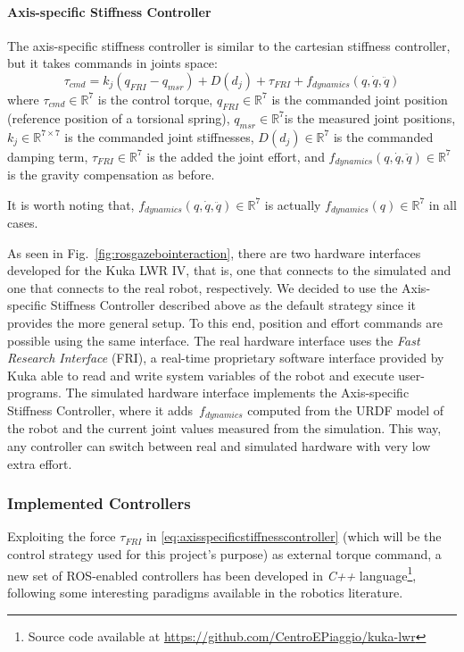 \paragraph{Axis-specific Stiffness Controller}
The axis-specific stiffness controller is similar to the cartesian stiffness controller, but it takes commands in joints space:
\begin{equation}
\tau_{cmd} = k_j(q_{FRI} - q_{msr}) + D(d_j) + \tau_{FRI} + f_{dynamics}(q,\dot{q},\ddot{q})
\label{eq:axisspecificstiffnesscontroller}
\end{equation}
where $\tau_{cmd}\in \mathbb{R}^7$ is the control torque, $q_{FRI}\in\mathbb{R}^7$ is the commanded joint position (reference position of a torsional spring), $q_{msr}\in\mathbb{R}^7$is the measured joint positions, $k_j\in\mathbb{R}^{7\times 7}$ is the commanded joint stiffnesses, $D(d_j)\in\mathbb{R}^7$ is the commanded damping term, $\tau_{FRI}\in\mathbb{R}^7$ is the added the joint effort, and $f_{dynamics}(q,\dot{q},\ddot{q})\in\mathbb{R}^7$ is the gravity compensation as before.

It is worth noting that, $f_{dynamics}(q,\dot{q},\ddot{q})\in\mathbb{R}^7$ is actually $f_{dynamics}(q)\in\mathbb{R}^7$ in all cases.

As seen in Fig.~\ref{fig:rosgazebointeraction}, there are two hardware interfaces developed for the Kuka LWR IV, that is, one that connects to the simulated and one that connects to the real robot, respectively. We decided to use the Axis-specific Stiffness Controller described above as the default strategy since it provides the more general setup. To this end, position and effort commands are possible using the same interface. The real hardware interface uses the \textit{Fast Research Interface} (FRI), a real-time proprietary software interface provided by Kuka able to read and write system variables of the robot and execute user-programs. The simulated hardware interface implements the Axis-specific Stiffness Controller, where it adds~$f_{dynamics}$ computed from the URDF model of the robot and the current joint values measured from the simulation. This way, any controller can switch between real and simulated hardware with very low extra effort.

\subsubsection{Implemented Controllers}%
Exploiting the force $\tau_{FRI}$ in \eqref{eq:axisspecificstiffnesscontroller} (which will be the control strategy used for this project's purpose) as external torque command, a new set of ROS-enabled controllers has been developed in \textit{C++} language\footnote{Source code available at \url{https://github.com/CentroEPiaggio/kuka-lwr}}, following some interesting paradigms available in the robotics literature.

